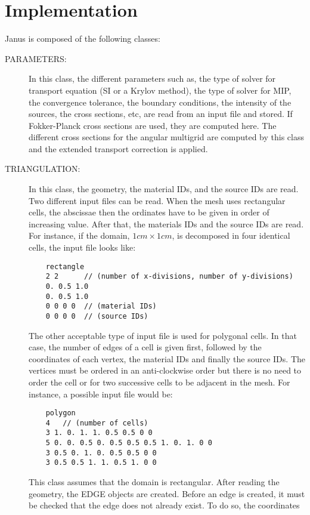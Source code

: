 \section{Implementation}
Janus is composed of the following classes:
\begin{description}
  \item[PARAMETERS:] In this class, the different parameters such as, the 
    type of solver for transport equation (SI or a Krylov method), the type 
    of solver for MIP, the convergence tolerance, the boundary conditions, 
    the intensity of the sources, the cross sections, etc, are read from an
    input file and stored. If Fokker-Planck cross sections are used, they 
    are computed here. The different cross sections for the angular
    multigrid are computed by this class and the extended transport correction 
    is applied.
  \item[TRIANGULATION:] In this class, the geometry, the material IDs, and the
    source IDs are read. Two different input files can be read. When the mesh
    uses rectangular cells, the abscissae then the ordinates have to be given 
    in order of increasing value. After that, the materials IDs and the source IDs 
    are read. For instance, if the domain, $1cm \times 1cm$, is decomposed 
    in four identical cells, the input file looks like:
    \begin{verbatim}
    rectangle
    2 2      // (number of x-divisions, number of y-divisions)
    0. 0.5 1.0
    0. 0.5 1.0
    0 0 0 0  // (material IDs)
    0 0 0 0  // (source IDs)
    \end{verbatim}
    The other acceptable type of input file is used for polygonal cells. In 
    that case, the number of edges of a cell is given first, followed by the 
    coordinates of each vertex, the material IDs and finally the source IDs.
    The vertices must be ordered in an anti-clockwise order but there is no need
    to order the cell or for two successive cells to be adjacent in the mesh. 
    For instance, a possible input file would be:
    \begin{verbatim}
    polygon
    4   // (number of cells)
    3 1. 0. 1. 1. 0.5 0.5 0 0
    5 0. 0. 0.5 0. 0.5 0.5 0.5 1. 0. 1. 0 0
    3 0.5 0. 1. 0. 0.5 0.5 0 0
    3 0.5 0.5 1. 1. 0.5 1. 0 0
    \end{verbatim}
    This class assumes that the domain is rectangular. After reading the
    geometry, the EDGE objects are created. Before an edge is created, it must
    be checked that the edge does not already exist. To do so, the coordinates

\end{description}
